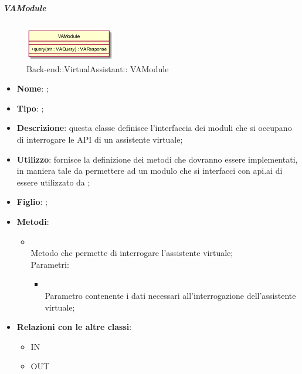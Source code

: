 \hypertarget{ VAModule_label}{\subparagraph{ VAModule}}
\begin{figure}[h]
	\centering
	\includegraphics[width=0.35\textwidth,height=\textheight,keepaspectratio]{images/ClassVAModule.png}
	\caption{Back-end::VirtualAssistant:: VAModule}
\end{figure}
\begin{itemize}
	\item \textbf{Nome}: ;
	\item \textbf{Tipo}: ;
	\item \textbf{Descrizione}: questa classe definisce l'interfaccia dei moduli che si occupano di interrogare le API di un assistente virtuale;
	\item \textbf{Utilizzo}: fornisce la definizione dei metodi che dovranno essere implementati, in maniera tale da permettere ad un modulo che si interfacci con api.ai di essere utilizzato da ;
	\item \textbf{Figlio}: ;
	\item \textbf{Metodi}:
	\begin{itemize}
		\item[]  \\		Metodo che permette di interrogare l'assistente virtuale;\\
		Parametri:
		\begin{itemize}
			\item {} \\
			Parametro contenente i dati necessari all'interrogazione dell'assistente virtuale;
		\end{itemize}
	\end{itemize}
	\item \textbf{Relazioni con le altre classi}:
	\begin{itemize}
		\item IN \hyperlink{VAService_label}{}
		\item OUT \hyperlink{VAQuery_label}{}
	\end{itemize}
\end{itemize}
\FloatBarrier


